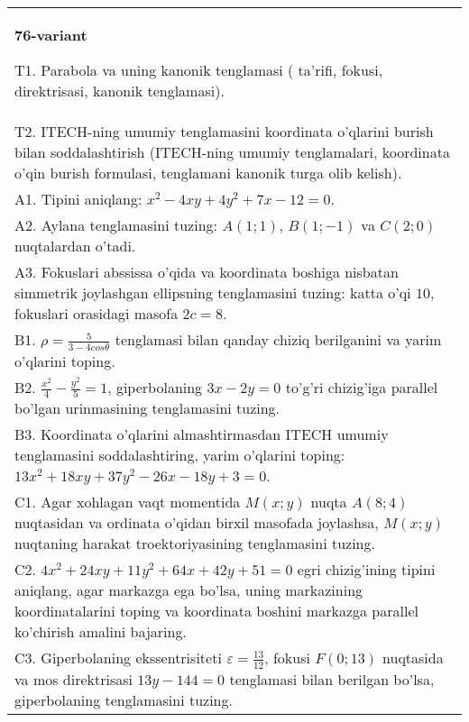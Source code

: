 \documentclass{article}
\begin{document}
\begin{tabular}{m{17cm}}
\textbf{76-variant}
\newline

T1. Parabola va uning kanonik tenglamasi ( ta'rifi, fokusi, direktrisasi, kanonik tenglamasi).\\

T2. ITECH-ning umumiy tenglamasini koordinata o'qlarini burish bilan soddalashtirish (ITECH-ning umumiy tenglamalari, koordinata o'qin burish formulasi, tenglamani kanonik turga olib kelish).\\

A1. Tipini aniqlang: $x^{2}-4xy+4y^{2}+7x-12=0$.\\

A2. Aylana tenglamasini tuzing: $A(1;1)$, $B(1;-1)$ va $C(2;0)$ nuqtalardan o'tadi.\\

A3. Fokuslari abssissa o'qida va koordinata boshiga nisbatan simmetrik joylashgan ellipsning tenglamasini tuzing: katta o'qi $10$, fokuslari orasidagi masofa $2c=8$.\\

B1. $\rho = \frac{5}{3 - 4cos\theta}$ tenglamasi bilan qanday chiziq berilganini va yarim o'qlarini toping.  \\

B2. $\frac{x^{2}}{4} - \frac{y^{2}}{5} = 1$, giperbolaning $3x - 2y = 0$ to'g'ri chizig'iga parallel bo'lgan urinmasining tenglamasini tuzing.  \\

B3. Koordinata o'qlarini almashtirmasdan ITECH umumiy tenglamasini soddalashtiring, yarim o'qlarini toping: $13x^{2} + 18xy + 37y^{2} - 26x - 18y + 3 = 0$.  \\

C1. Agar xohlagan vaqt momentida $M(x;y)$ nuqta $A(8;4)$ nuqtasidan va ordinata o'qidan birxil masofada joylashsa, $M(x;y)$ nuqtaning harakat troektoriyasining tenglamasini tuzing.  \\

C2. $4x^{2} + 24xy + 11y^{2} + 64x + 42y + 51 = 0$ egri chizig'ining tipini aniqlang, agar markazga ega bo'lsa, uning markazining koordinatalarini toping va koordinata boshini markazga parallel ko'chirish amalini bajaring.\\

C3. Giperbolaning ekssentrisiteti $\varepsilon = \frac{13}{12}$, fokusi $F(0;13)$ nuqtasida va mos direktrisasi $13y - 144 = 0$ tenglamasi bilan berilgan bo'lsa, giperbolaning tenglamasini tuzing.  \\

\end{tabular}
\vspace{1cm}
\end{document}

